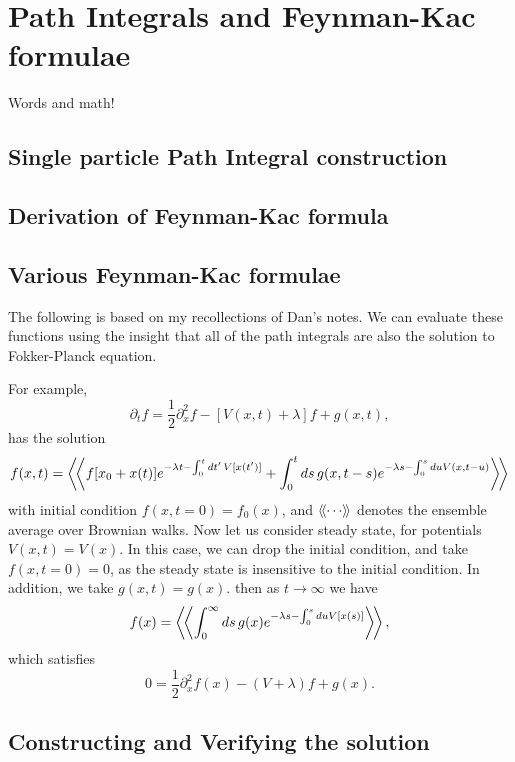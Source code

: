 \chapter{Path Integrals and Feynman-Kac formulae}
Words and math!
\section{ Single particle Path Integral construction}
\section{Derivation of Feynman-Kac formula }
\section{ Various Feynman-Kac formulae}



The following is based on my recollections of Dan's notes.  
We can evaluate these functions using the insight that all of the path integrals are also the solution to Fokker-Planck equation.  

For example,
\begin{equation}
\partial_t f = \frac{1}{2}\partial_x^2 f  - [V(x,t)+\lambda]f +g(x,t) ,
\end{equation}
has the solution
\begin{equation}
  f(x,t) = \left\langle\!\left\langle  f[x_0+x(t)] e^{-\lambda t - \int_0^t dt'\,V[x(t')]} + \int_0^t ds\,g(x,t-s) e^{-\lambda s-\int_0^s du V(x,t-u)} \right\rangle\!\right\rangle 
\end{equation}
with initial condition $f(x,t=0)= f_0(x)$, and $\dlangle \cdots\drangle$ denotes the ensemble average over Brownian walks.
Now let us consider steady state, for potentials $V(x,t) = V(x)$.  In this case, we can drop the initial condition, and take $f(x,t=0)=0$, as the steady state is insensitive to the initial condition.  In addition, we take $g(x,t)=g(x)$.   then as $t\rightarrow \infty$ we have 
\begin{equation}
  f(x) = \left\langle\!\left\langle \int_0^\infty ds\,g(x) e^{-\lambda s-\int_0^s du V[x(s)]} \right\rangle\!\right\rangle,\label{eq:path_int_solution}
\end{equation}
which satisfies 
\begin{equation}
0 = \frac{1}{2}\partial_x^2f(x) - (V+\lambda)f + g(x).  
\end{equation}

\section{Constructing and Verifying the solution}
